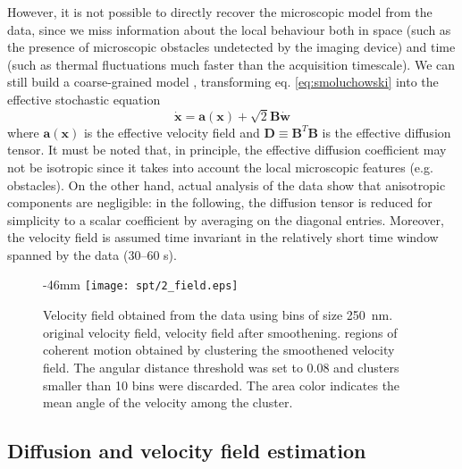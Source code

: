 However, it is not possible to directly recover the microscopic model from the  data, since we miss information about the local behaviour both in space (such as the presence of microscopic obstacles undetected by the imaging device) and time (such as thermal fluctuations much faster than the acquisition timescale). We can still build a coarse-grained model , transforming eq. \ref{eq:smoluchowski} into the effective stochastic equation
\begin{equation} \label{eq:effective}
 \dot{\bm{x}} = \bm{a}(\bm{x}) + \sqrt{2}\bm{B} \dot{\bm{w}}
\end{equation}
where $\bm{a}(\bm{x})$ is the effective velocity field and $\bm{D} \equiv \bm{B}^T\bm{B}$ is the effective diffusion tensor. It must be noted that, in principle, the effective diffusion coefficient may not be isotropic since it takes into account the local microscopic features (e.g. obstacles). On the other hand, actual analysis of the data show that anisotropic components are negligible: in the following, the diffusion tensor is reduced for simplicity to a scalar coefficient by averaging on the diagonal entries. Moreover, the velocity field is assumed time invariant in the relatively short time window spanned by the  data (30--60 s).

\begin{figure}
    \begin{adjustwidth*}{}{-46mm}
      \texttt{[image: spt/2\_field.eps]}%
      {{\label{fig:vf_original}}%
      {\label{fig:vf_smooth}}%
      {\label{fig:vf_cdr}}}%
      \caption{Velocity field obtained from the  data using bins of size \SI{250}{\nano\metre}. \enspace original velocity field, \enspace velocity field after smoothening. \enspace regions of coherent motion obtained by clustering the smoothened velocity field. The angular distance threshold was set to \SI{0.08}{} and clusters smaller than 10 bins were discarded. The area color indicates the mean angle of the velocity among the cluster.\label{fig:vf}}
  \end{adjustwidth*}
\end{figure}


\subsection{Diffusion and velocity field estimation}

